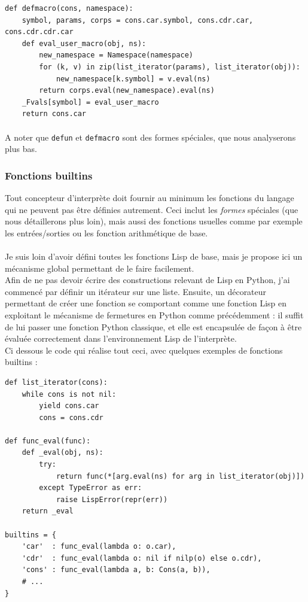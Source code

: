 \documentclass{article}
\begin{document}
\begin{verbatim}
def defmacro(cons, namespace):
    symbol, params, corps = cons.car.symbol, cons.cdr.car, cons.cdr.cdr.car
    def eval_user_macro(obj, ns):
        new_namespace = Namespace(namespace)
        for (k, v) in zip(list_iterator(params), list_iterator(obj)):
            new_namespace[k.symbol] = v.eval(ns)
        return corps.eval(new_namespace).eval(ns)
    _Fvals[symbol] = eval_user_macro
    return cons.car
\end{verbatim}

\paragraph{}
A noter que \texttt{defun} et \texttt{defmacro} sont des formes spéciales, que nous analyserons plus bas.

\subsubsection{Fonctions builtins}
Tout concepteur d'interprète doit fournir au minimum les fonctions du langage qui ne peuvent pas
être définies autrement. Ceci inclut les \emph{formes} spéciales (que nous détaillerons plus loin), mais aussi 
des fonctions usuelles comme par exemple les entrées/sorties ou les fonction arithmétique de base.
\paragraph{}
Je suis loin d'avoir défini toutes les fonctions Lisp de base, mais je propose ici un mécanisme global
permettant de le faire facilement.
\\
Afin de ne pas devoir écrire des constructions relevant de Lisp en Python, j'ai commencé par définir 
un itérateur sur une liste. Ensuite, un décorateur permettant de créer une fonction se comportant
comme une fonction Lisp en exploitant le mécanisme de fermetures en Python comme précédemment :
il suffit de lui passer une fonction Python classique, et elle est encapsulée de façon à être évaluée 
correctement dans l'environnement Lisp de l'interprète.
\\
Ci dessous le code qui réalise tout ceci, avec quelques exemples de fonctions builtins :

\begin{verbatim}
def list_iterator(cons):
    while cons is not nil:
        yield cons.car
        cons = cons.cdr

def func_eval(func):
    def _eval(obj, ns):
        try:
            return func(*[arg.eval(ns) for arg in list_iterator(obj)])
        except TypeError as err:
            raise LispError(repr(err))
    return _eval

builtins = {
    'car'  : func_eval(lambda o: o.car),
    'cdr'  : func_eval(lambda o: nil if nilp(o) else o.cdr),
    'cons' : func_eval(lambda a, b: Cons(a, b)),
    # ...
}
\end{verbatim}
\end{document}

